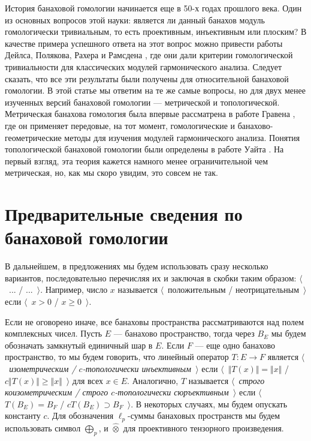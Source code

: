 \documentclass{article}
\numberwithin{equation}{section}
\theoremstyle{plain}
\theoremstyle{definition}
\newcommand{\projtens}{\mathbin{\widehat{\otimes}}}
\begin{document}
\begin{fulltext}
История банаховой гомологии начинается еще в 50-х годах прошлого века. 
Один из основных вопросов этой науки: является ли данный банахов модуль 
гомологически тривиальным, то есть проективным, инъективным или плоским? 
В качестве примера успешного ответа на этот вопрос можно привести работы 
Дейлса, Полякова, Рахера и Рамсдена 
\cite{DalPolHomolPropGrAlg, RamsHomPropSemgroupAlg, RachInjModAndAmenGr}, 
где они дали критерии гомологической тривиальности для классических модулей 
гармонического анализа. Следует сказать, что все эти результаты были получены 
для относительной банаховой гомологии. В этой статье мы ответим на те же 
самые вопросы, но для двух менее изученных версий банаховой гомологии --- 
метрической и топологической. Метрическая банахова гомология была впервые 
рассматрена в работе Гравена \cite{GravInjProjBanMod}, где он применяет передовые, 
на тот момент, гомологические и банахово-геометрические методы для изучения 
модулей гармонического анализа. Понятия топологической банаховой гомологии 
были определены в работе Уайта \cite{WhiteInjmoduAlg}. На первый взгляд, 
эта теория кажется намного менее ограничительной чем метрическая, но, как 
мы скоро увидим, это совсем не так.



\section{Предварительные сведения по банаховой гомологии}\label{SectionPreliminariesOnBanachHomology}

В дальнейшем, в предложениях мы будем использовать сразу несколько вариантов, 
последовательно перечисляя их и заключая в скобки таким образом: 
$\langle$~... / ...~$\rangle$. Например, число $x$ называется 
$\langle$~положительным / неотрицательным~$\rangle$ если 
$\langle$~$x>0$ / $x\geq 0$~$\rangle$.

Если не оговорено иначе, все банаховы пространства рассматриваются над полем 
комплексных чисел. Пусть $E$ --- банахово пространство, тогда через $B_E$ мы будем 
обозначать замкнутый единичный шар в $E$. Если $F$ --- еще одно банахово 
пространство, то мы будем говорить, что линейный оператор $T:E\to F$ является 
\emph{$\langle$~изометрическим / $c$-топологически инъективным~$\rangle$} если 
$\langle$~$\Vert T(x)\Vert=\Vert x\Vert$ / $c\Vert T(x)\Vert\geq\Vert x\Vert$~$\rangle$ 
для всех $x\in E$. Аналогично, $T$ называется \emph{$\langle$~строго коизометрическим / 
строго $c$-топологически сюръективным~$\rangle$} если $\langle$~$T(B_E)=B_F$ / 
$c T(B_E)\supset B_F$~$\rangle$. В некоторых случаях, мы будем опускать константу $c$. 
Для обозначения $\ell_p$-суммы банаховых пространств мы будем использовать 
символ $\bigoplus_p$, и $\projtens$ для проективного тензорного произведения. 


\end{fulltext}
\end{document}
